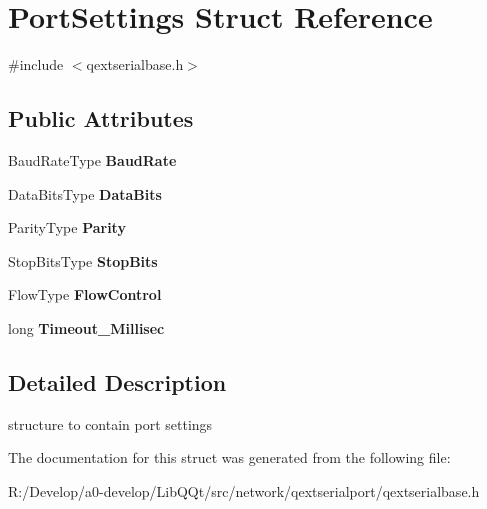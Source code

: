 \hypertarget{struct_port_settings}{}\section{Port\+Settings Struct Reference}
\label{struct_port_settings}


{\ttfamily \#include $<$qextserialbase.\+h$>$}

\subsection*{Public Attributes}
\begin{DoxyCompactItemize}
\item 
\mbox{\label{struct_port_settings_abe617f3545d6be4587e1a0700a0b0e5b}} 
Baud\+Rate\+Type {\bfseries Baud\+Rate}
\item 
\mbox{\label{struct_port_settings_a9ec9d5a304b2ac8d3a100d07bce7c0b6}} 
Data\+Bits\+Type {\bfseries Data\+Bits}
\item 
\mbox{\label{struct_port_settings_a8d0bfbdcb40e9e3919e3f9829ae72582}} 
Parity\+Type {\bfseries Parity}
\item 
\mbox{\label{struct_port_settings_a0752c70eb7e12f02ddf59739a056b04c}} 
Stop\+Bits\+Type {\bfseries Stop\+Bits}
\item 
\mbox{\label{struct_port_settings_a10720f6217b8d8b90c326ea030c43e30}} 
Flow\+Type {\bfseries Flow\+Control}
\item 
\mbox{\label{struct_port_settings_a7147addae7fce6e8e4b302014967a0db}} 
long {\bfseries Timeout\+\_\+\+Millisec}
\end{DoxyCompactItemize}


\subsection{Detailed Description}
structure to contain port settings 

The documentation for this struct was generated from the following file\+:\begin{DoxyCompactItemize}
\item 
R\+:/\+Develop/a0-\/develop/\+Lib\+Q\+Qt/src/network/qextserialport/qextserialbase.\+h\end{DoxyCompactItemize}
